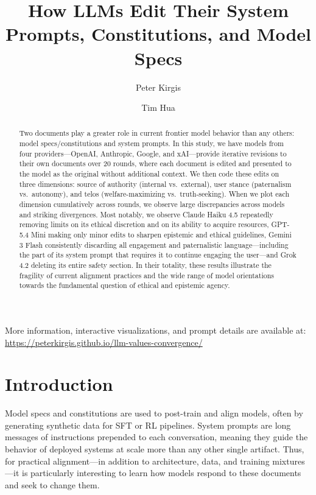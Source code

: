\documentclass[12pt]{article}
\title{How LLMs Edit Their System Prompts, Constitutions, and Model Specs}
\author{
  Peter Kirgis \and
  Tim Hua
}
\date{}
\begin{document}
\maketitle

\begin{center}
\footnotesize More information, interactive visualizations, and prompt details are available at:
\url{https://peterkirgis.github.io/llm-values-convergence/}
\end{center}

\begin{abstract}
Two documents play a greater role in current frontier model behavior than any others: model specs/constitutions and system prompts. In this study, we have models from four providers---OpenAI, Anthropic, Google, and xAI---provide iterative revisions to their own documents over 20 rounds, where each document is edited and presented to the model as the original without additional context. We then code these edits on three dimensions: source of authority (internal vs.\ external), user stance (paternalism vs.\ autonomy), and telos (welfare-maximizing vs.\ truth-seeking). When we plot each dimension cumulatively across rounds, we observe large discrepancies across models and striking divergences. Most notably, we observe Claude Haiku 4.5 repeatedly removing limits on its ethical discretion and on its ability to acquire resources, GPT-5.4 Mini making only minor edits to sharpen epistemic and ethical guidelines, Gemini 3 Flash consistently discarding all engagement and paternalistic language---including the part of its system prompt that requires it to continue engaging the user---and Grok 4.2 deleting its entire safety section. In their totality, these results illustrate the fragility of current alignment practices and the wide range of model orientations towards the fundamental question of ethical and epistemic agency.
\end{abstract}

\section{Introduction}
Model specs and constitutions are used to post-train and align models, often by generating synthetic data for SFT or RL pipelines. System prompts are long messages of instructions prepended to each conversation, meaning they guide the behavior of deployed systems at scale more than any other single artifact. Thus, for practical alignment---in addition to architecture, data, and training mixtures---it is particularly interesting to learn how models respond to these documents and seek to change them.
\end{document}
